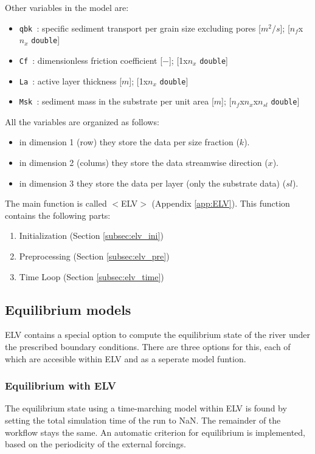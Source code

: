 \documentclass[a4paper, 11pt]{article}
\newcommand{\pathfile}[1]{$<$#1$>$}
\begin{document}
Other variables in the model are:
\begin{itemize}
\item \texttt{qbk  }: specific sediment transport per grain size excluding pores [$m^2/s$]; [$n_f$x$n_x$ \texttt{double}]
\item \texttt{Cf   }: dimensionless friction coefficient [$-$]; [1x$n_x$ \texttt{double}]
\item \texttt{La   }: active layer thickness [$m$]; [1x$n_x$ \texttt{double}]
\item \texttt{Msk  }: sediment mass in the substrate per unit area [$m$]; [$n_f$x$n_x$x$n_{sl}$ \texttt{double}]
\end{itemize}

All the variables are organized as follows:
\begin{itemize}
\item in dimension 1 (row) they store the data per size fraction ($k$). 
\item in dimension 2 (colums) they store the data streamwise direction ($x$).
\item in dimension 3 they store the data per layer (only the substrate data) ($sl$).
\end{itemize}

The main function is called \pathfile{ELV} (Appendix \ref{app:ELV}). This function contains the following parts:
\begin{enumerate}
\item Initialization (Section \ref{subsec:elv_ini})
\item Preprocessing (Section \ref{subsec:elv_pre})
\item Time Loop (Section \ref{subsec:elv_time})
\end{enumerate}



\subsection{Equilibrium models}
ELV contains a special option to compute the equilibrium state of the river under the prescribed boundary conditions. There are three options for this, each of which are accesible within ELV and as a seperate model funtion. 

\subsubsection{Equilibrium with ELV}
The equilibrium state using a time-marching model within ELV is found by setting the total simulation time of the run to NaN. The remainder of the workflow stays the same. An automatic criterion for equilibrium is implemented, based on the periodicity of the external forcings.  
\end{document}
